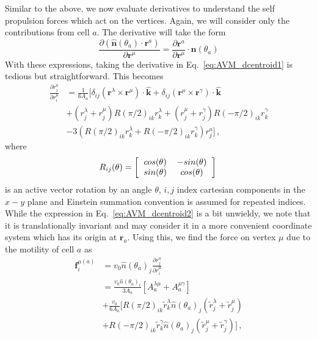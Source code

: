 \documentclass[
reprint
,aps
,amssymb
,amsmath
,superscriptaddress
]{revtex4-1}
\begin{document}
Similar to the above, we now evaluate derivatives to understand the self propulsion forces which act on the vertices. Again, we will consider only the contributions from cell $a$. The derivative will take the form
%
\begin{equation}\label{eq:AVM_dcentroid1}
\frac{\partial (\mathbf{\hat{n}}(\theta_a) \cdot \mathbf{r}^a) }{\partial \mathbf{r}^\mu} = \frac{\partial  \mathbf{r}^a }{\partial \mathbf{r}^\mu} \cdot \mathbf{\hat{n}}(\theta_a)
\end{equation}
%
With these expressions, taking the derivative in Eq.~\ref{eq:AVM_dcentroid1} is tedious but straightforward. This becomes
%
\begin{equation}
\begin{aligned}\label{eq:AVM_dcentroid2}
\frac{\partial r^a_{j}}{\partial r^\mu_{i}} &= \frac{1}{6 A_a} \Bigg[ \delta_{ij} (\mathbf{r}^\lambda \times \mathbf{r}^\mu)\cdot\mathbf{\hat{k}} + \delta_{ij} (\mathbf{r}^\mu \times \mathbf{r}^\gamma)\cdot\mathbf{\hat{k}} \\ & + (r_j^\lambda + r_j^\mu) R(\pi/2)_{ik} r^\lambda_k + (r_j^\mu + r_j^\gamma) R(-\pi/2)_{ik} r^\gamma_k \\ & -3 (R(\pi/2)_{ik} r^\lambda_k + R(-\pi/2)_{ik} r^\gamma_k) r^a_{j} \Bigg] \, ,
\end{aligned}
\end{equation}
%
where
%
\begin{equation}\label{eq:AVM_rotation}
R_{ij}(\theta) = 
\left[
  \begin{tabular}{cc}
  $cos(\theta)$ &  $-sin(\theta)$ \\
  $sin(\theta)$ &  $cos(\theta)$
  \end{tabular}
\right]
\, 
\end{equation}
%
is an active vector rotation by an angle $\theta$, $i,j$ index cartesian components in the $x-y$ plane and Einstein summation convention is assumed for repeated indices. While the expression in Eq.~\ref{eq:AVM_dcentroid2} is a bit unwieldy, we note that it is translationally invariant and may consider it in a more convenient coordinate system which has its origin at $\mathbf{r}_a$. Using this, we find the force on vertex $\mu$ due to the motility of cell $a$ as
%
\begin{equation}
\begin{aligned}\label{eq:AVM_motile_vforce}
\mathbf{f}^{\mu(a)}_{i} &= v_0 \hat{n}(\theta_a)_{j}\frac{\partial r^a_{j}}{\partial r^\mu_{i}} \\ & = \frac{v_0 \hat{n}(\theta_a)_i}{3 A_a} [ A_a^{\lambda\mu} + A_a^{\mu\gamma} ] \\ & + \frac{v_0}{6 A_a} \Bigg[ R(\pi/2)_{ik} \tilde{r}^\lambda_k \hat{n}(\theta_a)_{j} (\tilde{r}_j^\lambda + \tilde{r}_j^\mu) \\ &  + R(-\pi/2)_{ik} \tilde{r}^\gamma_k  \hat{n}(\theta_a)_{j} (\tilde{r}_j^\mu + \tilde{r}_j^\gamma)   \Bigg] \, ,
\end{aligned}
\end{equation}
\end{document}
